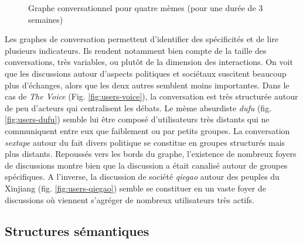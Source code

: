 \begin{figure}[h!]
{    }
    
  \caption{  
    Graphe conversationnel pour quatre mèmes (pour une durée de 3 semaines)
  }
\end{figure}

Les graphes de conversation permettent d{\textquoteright}identifier des spécificités et de lire plusieurs indicateurs. Ils rendent notamment bien compte de la taille des conversations, très variables, ou plut\^ot de la dimension des interactions. On voit que les discussions autour d{\textquoteright}aspects politiques et sociétaux suscitent beaucoup plus d{\textquoteright}échanges, alors que les deux autres semblent moins importantes. Dans le cas de \textit{The Voice} (Fig. \ref{fig:users-voice}), la conversation est très structurée autour de peu d{\textquoteright}acteurs qui centralisent les débats. Le mème absurdiste \textit{dufu} (fig. \ref{fig:users-dufu}) semble lui être composé d{\textquoteright}utilisateurs très distants qui ne communiquent entre eux que faiblement ou par petits groupes. La conversation \textit{sextape }autour du fait divers politique se constitue en groupes structurés mais plus distants. Repoussés vers les bords du graphe, l{\textquoteright}existence de nombreux foyers de discussions montre bien que la discussion a était canalisé autour de groupes spécifiques. A l{\textquoteright}inverse, la discussion de société \textit{qiegao}\textit{ }autour des peuples du Xinjiang (fig. \ref{fig:users-qiegao}) semble se constituer en un vaste foyer de discussions o\`u viennent s{\textquoteright}agréger de nombreux utilisateurs très actifs. 

\subsection[Structures sémantiques]{Structures sémantiques}

